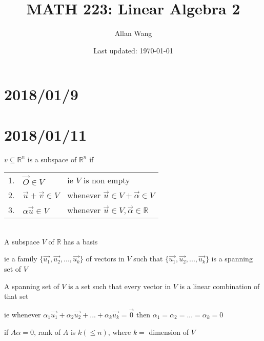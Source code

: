 \documentclass[12pt]{article}
\author{Allan Wang}
\date{Last updated: \today}
\title{MATH 223: Linear Algebra 2}
\renewcommand{\v}[1]{\overrightarrow{#1}}
\newcommand{\vectorset}[1]{\{\v{#1_1}, \v{#1_2}, ..., \v{#1_k}\}}
\newcommand{\vectorseqtwo}[2]{#1_1\v{#2_1} + #1_2\v{#2_2} + ... + #1_k\v{#2_k}}
\newcommand{\real}[0]{\mathbb{R}}
\begin{document}
\onehalfspacing
\maketitle
\tableofcontents
\pagebreak
\section{2018/01/9}
\section{2018/01/11}

$v \subseteq \real^n$ is a subspace of $\real^n$ if \\

\begin{tabular}{@{}l l l}
	1. & $\vec{O} \in V$ & ie $V$ is non empty \\
	2. & $\vec{u} + \vec{v} \in V$ & whenever $\vec{u} \in V + \vec{\alpha} \in V$ \\
	3. & $\alpha \vec{u} \in V$ & whenever $\vec{u} \in V, \vec{\alpha} \in \real$	
\end{tabular} \\

A subspace $V$ of $\real$ has a basis

ie a family $\vectorset{u}$ of vectors in $V$ such that $\vectorset{u}$ is a spanning set of $V$

A spanning set of $V$ is a set such that every vector in $V$ is a linear combination of that set

ie whenever $\vectorseqtwo{\alpha}{u} = \vec{0}$ then $\alpha_1 = \alpha_2 = ... = \alpha_k = 0$

if $A\alpha = 0$, rank of $A$ is $k (\le n)$, where $k =$ dimension of $V$
\end{document}
